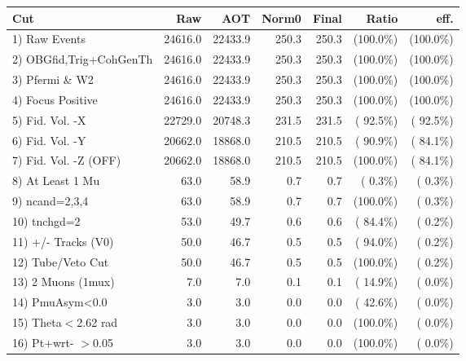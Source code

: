  \begin{table}[h!]\centering
 \begin{tabular}{||l||r|r|r|r|r|r||}
 \hline
 \hline
 Cut & Raw & AOT & Norm0 & Final & Ratio & eff.       \\
 \hline
  1) Raw Events           &      24616.0 &      22433.9 &        250.3 &        250.3 & (100.0\%) & (100.0\%) \\
  2) OBGfid,Trig+CohGenTh &      24616.0 &      22433.9 &        250.3 &        250.3 & (100.0\%) & (100.0\%) \\
  3) Pfermi \& W2         &      24616.0 &      22433.9 &        250.3 &        250.3 & (100.0\%) & (100.0\%) \\
  4) Focus Positive       &      24616.0 &      22433.9 &        250.3 &        250.3 & (100.0\%) & (100.0\%) \\
  5) Fid. Vol. -X         &      22729.0 &      20748.3 &        231.5 &        231.5 & ( 92.5\%) & ( 92.5\%) \\
  6) Fid. Vol. -Y         &      20662.0 &      18868.0 &        210.5 &        210.5 & ( 90.9\%) & ( 84.1\%) \\
  7) Fid. Vol. -Z (OFF)   &      20662.0 &      18868.0 &        210.5 &        210.5 & (100.0\%) & ( 84.1\%) \\
  8) At Least 1 Mu        &         63.0 &         58.9 &          0.7 &          0.7 & (  0.3\%) & (  0.3\%) \\
  9) ncand=2,3,4          &         63.0 &         58.9 &          0.7 &          0.7 & (100.0\%) & (  0.3\%) \\
 10) tnchgd=2             &         53.0 &         49.7 &          0.6 &          0.6 & ( 84.4\%) & (  0.2\%) \\
 11) +/- Tracks (V0)      &         50.0 &         46.7 &          0.5 &          0.5 & ( 94.0\%) & (  0.2\%) \\
 12) Tube/Veto Cut        &         50.0 &         46.7 &          0.5 &          0.5 & (100.0\%) & (  0.2\%) \\
 13) 2 Muons (1mux)       &          7.0 &          7.0 &          0.1 &          0.1 & ( 14.9\%) & (  0.0\%) \\
 14) PmuAsym<0.0          &          3.0 &          3.0 &          0.0 &          0.0 & ( 42.6\%) & (  0.0\%) \\
 15) Theta$<$2.62 rad     &          3.0 &          3.0 &          0.0 &          0.0 & (100.0\%) & (  0.0\%) \\
 16) Pt+wrt- $>$0.05      &          3.0 &          3.0 &          0.0 &          0.0 & (100.0\%) & (  0.0\%) \\

\end{tabular}
\end{table}
